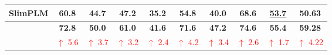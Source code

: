 \begin{table*}[t]
{\begin{tabular}{@{}lccccccccc@{}}
\multicolumn{1}{l|}{SlimPLM}                                                                          & 60.8                            & \multicolumn{1}{c|}{44.7}                                                    & 47.2                            & \multicolumn{1}{c|}{35.2}                                                    & 54.8                            & \multicolumn{1}{c|}{40.0}                                                    & 68.6                            & \multicolumn{1}{c|}{\underline{53.7}}                                        & 50.63                              \\ \midrule
\rowcolor[HTML]{D3E8E7} 
\multicolumn{1}{l|}{\cellcolor[HTML]{D3E8E7}\modelname(Ours)}                                         & \textbf{72.8}                   & \multicolumn{1}{c|}{\cellcolor[HTML]{D3E8E7}\textbf{50.0}}                   & \textbf{61.0}                   & \multicolumn{1}{c|}{\cellcolor[HTML]{D3E8E7}\textbf{41.6}}                   & \textbf{71.6}                   & \multicolumn{1}{c|}{\cellcolor[HTML]{D3E8E7}\textbf{47.2}}                   & \textbf{74.6}                   & \multicolumn{1}{c|}{\cellcolor[HTML]{D3E8E7}\textbf{55.4}}                   & \textbf{59.28}                     \\
\rowcolor[HTML]{D3E8E7} 
\multicolumn{1}{c|}{\cellcolor[HTML]{D3E8E7}}                                                         & \textcolor{red}{$\uparrow$ 5.6} & \multicolumn{1}{c|}{\cellcolor[HTML]{D3E8E7}\textcolor{red}{$\uparrow$ 3.7}} & \textcolor{red}{$\uparrow$ 3.2} & \multicolumn{1}{c|}{\cellcolor[HTML]{D3E8E7}\textcolor{red}{$\uparrow$ 2.4}} & \textcolor{red}{$\uparrow$ 4.2} & \multicolumn{1}{c|}{\cellcolor[HTML]{D3E8E7}\textcolor{red}{$\uparrow$ 3.4}} & \textcolor{red}{$\uparrow$ 2.6} & \multicolumn{1}{c|}{\cellcolor[HTML]{D3E8E7}\textcolor{red}{$\uparrow$ 1.7}} & \textcolor{red}{$\uparrow$ 4.22}   \\ \bottomrule
\end{tabular}
\vspace{-0.8em}
}
\end{table*}